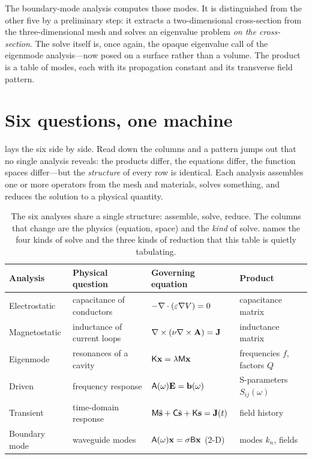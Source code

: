 The boundary-mode analysis computes those modes. It is distinguished from the
other five by a preliminary step: it extracts a two-dimensional cross-section
from the three-dimensional mesh and solves an eigenvalue problem \emph{on the
cross-section}. The solve itself is, once again, the opaque eigenvalue call of
the eigenmode analysis---now posed on a surface rather than a volume. The product
is a table of modes, each with its propagation constant and its transverse field
pattern.

\section{Six questions, one machine}

 lays the six side by side. Read down the columns and a
pattern jumps out that no single analysis reveals: the products differ, the
equations differ, the function spaces differ---but the \emph{structure} of every
row is identical. Each analysis assembles one or more operators from the mesh and
materials, solves something, and reduces the solution to a physical quantity.

\begin{table}[t]
\centering
\caption[The six analyses, compared]{The six analyses share a single structure:
assemble, solve, reduce. The columns that change are the physics (equation,
space) and the \emph{kind} of solve.  names the four kinds of
solve and the three kinds of reduction that this table is quietly tabulating.}
\label{tab:sixanalyses}
\small
\setlength{\tabcolsep}{4.5pt}
\begin{tabular}{@{}llll@{}}
\toprule
Analysis & Physical question & Governing equation & Product \\
\midrule
Electrostatic & capacitance of conductors & $-\nabla\cdot(\varepsilon\nabla V)=0$ & capacitance matrix \\
Magnetostatic & inductance of current loops & $\nabla\times(\nu\nabla\times\mathbf{A})=\mathbf{J}$ & inductance matrix \\
Eigenmode & resonances of a cavity & $\mathsf{K}\mathbf{x}=\lambda\mathsf{M}\mathbf{x}$ & frequencies $f$, factors $Q$ \\
Driven & frequency response & $\mathsf{A}(\omega)\mathbf{E}=\mathbf{b}(\omega)$ & S-parameters $S_{ij}(\omega)$ \\
Transient & time-domain response & $\mathsf{M}\ddot{\mathbf{s}}+\mathsf{C}\dot{\mathbf{s}}+\mathsf{K}\mathbf{s}=\mathbf{J}(t)$ & field history \\
Boundary mode & waveguide modes & $\mathsf{A}(\omega)\mathbf{x}=\sigma\mathsf{B}\mathbf{x}$ (2-D) & modes $k_n$, fields \\
\bottomrule
\end{tabular}
\end{table}

